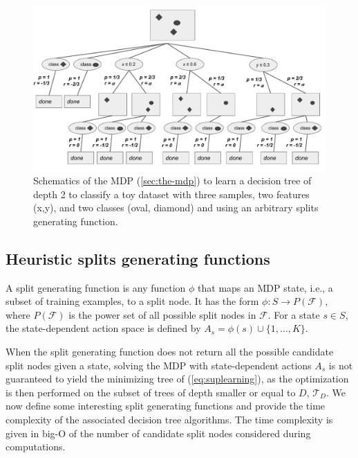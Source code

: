 \begin{figure}
      \centering
      \includegraphics[width=0.9\linewidth]{images/figures/schema_mdp.pdf}
      \caption{Schematics of the MDP (\ref{sec:the-mdp}) to learn a decision tree of depth 2 to classify a toy dataset with three samples, two features (x,y), and two classes (oval, diamond) and using an arbitrary splits generating function.}\label{fig:schema-mdp}
      \end{figure}

\subsection{Heuristic splits generating functions}\label{sec:testgen}

A split generating function is any function $\phi$ that maps an MDP state, i.e., a subset of training examples, to a split node. It has the form $\phi: S \rightarrow P(\mathcal{F})$, where $P(\mathcal{F})$ is the power set of all possible split nodes in $\mathcal F$. 
For a state $s \in S$, the state-dependent action space is defined by $A_s = \phi(s) \cup  \{1,\ldots,K\}$. 

When the split generating function does not return all the possible candidate split nodes given a state, solving the MDP with state-dependent actions $A_s$ is not guaranteed to yield the minimizing tree of (\ref{eq:suplearning}), as the 
optimization is then performed on the subset of trees of depth smaller or equal to $D$, $\mathcal{T}_D$. 
We now define some interesting split generating functions and provide the time complexity of the associated decision tree algorithms. The time complexity is given in big-O of the number of candidate split nodes considered during computations. 

